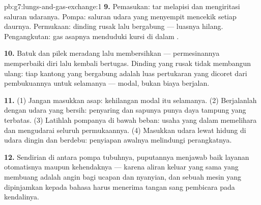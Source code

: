 \begin{solution}{pb:g7:lungs-and-gas-exchange:1}
\textbf{9.} Pemasukan: tar melapisi dan mengiritasi saluran udaranya.
Pompa: saluran udara yang menyempit mencekik setiap daurnya.
Permukaan: dinding  rusak lalu bergabung --- luasnya
hilang. Pengangkutan: gas asapnya menduduki kursi  di dalam
.

\textbf{10.} Batuk dan pilek meradang lalu membersihkan ---
permesinannya memperbaiki diri lalu kembali bertugas. Dinding 
yang rusak tidak membangun ulang: tiap kantong yang bergabung adalah
luas pertukaran yang dicoret dari pembukuannya untuk selamanya ---
modal, bukan biaya berjalan.

\textbf{11.} (1) Jangan masukkan asap: kehilangan modal itu selamanya.
(2) Berjalanlah dengan udara yang bersih: penyaring dan sapunya punya
daya tampung yang terbatas. (3) Latihlah pompanya di bawah beban:
usaha yang dalam memelihara  dan mengudarai seluruh
permukaannya. (4) Masukkan udara lewat hidung di udara dingin dan
berdebu: penyiapan awalnya melindungi perangkatnya.

\textbf{12.} Sendirian di antara pompa tubuhnya, puputannya menjawab
baik layanan otomatisnya maupun kehendaknya --- karena aliran keluar
yang sama yang membuang  adalah angin bagi ucapan dan
nyanyian, dan sebuah mesin yang dipinjamkan kepada bahasa harus
menerima tangan sang pembicara pada kendalinya.
\end{solution}
